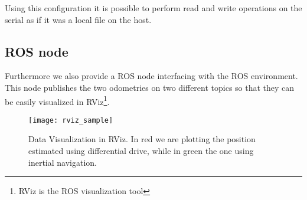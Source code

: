 
Using this configuration it is possible to perform read and write operations on the serial as if it was a local file on the host.

\subsection{ROS node}

Furthermore we also provide a ROS node interfacing with the ROS environment. This node publishes the two odometries on two different topics so that they can be easily visualized in RViz\footnote{RViz is the ROS visualization tool}.
\begin{figure}[!ht]
	\texttt{[image: rviz\_sample]}
	\captionsetup{justification=centering, margin=1.5cm}
	\centering
	\caption{Data Visualization in RViz. In red we are plotting the position estimated using differential drive, while in green the one using inertial navigation.}
	\centering
\end{figure}
